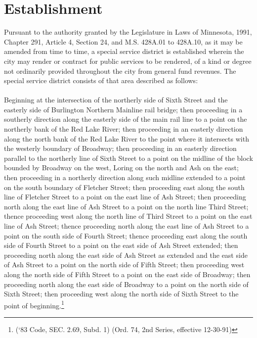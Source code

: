 
\setcounter{section}{14}
\section{Establishment}
Pursuant to the authority granted by the Legislature in Laws of Minnesota, 1991, Chapter 291, Article 4, Section 24, and M.S. \textsection 428A.01 to \textsection 428A.10, as it may be amended from time to time, a special service district is established wherein the city may render or contract for public services to be rendered, of a kind or degree not ordinarily provided throughout the city from general fund revenues. The special service district consists of that area described as follows:\\
\\
Beginning at the intersection of the northerly side of Sixth Street and the easterly side of Burlington Northern Mainline rail bridge; then proceeding in a southerly direction along the easterly side of the main rail line to a point on the northerly bank of the Red Lake River; then proceeding in an easterly direction along the north bank of the Red Lake River to the point where it intersects with the westerly boundary of Broadway; then proceeding in an easterly direction parallel to the northerly line of Sixth Street to a point on the midline of the block bounded by Broadway on the west, Loring on the north and Ash on the east; then proceeding in a northerly direction along such midline extended to a point on the south boundary of Fletcher Street; then proceeding east along the south line of Fletcher Street to a point on the east line of Ash Street; then proceeding north along the east line of Ash Street to a point on the north line Third Street; thence proceeding west along the north line of Third Street to a point on the east line of Ash Street; thence proceeding north along the east line of Ash Street to a point on the south side of Fourth Street; thence proceeding east along the south side of Fourth Street to a point on the east side of Ash Street extended; then proceeding north along the east side of Ash Street as extended and the east side of Ash Street to a point on the north side of Fifth Street; then proceeding west along the north side of Fifth Street to a point on the east side of Broadway; then proceeding north along the east side of Broadway to a point on the north side of Sixth Street; then proceeding west along the north side of Sixth Street to the point of beginning.\footnote{(‘83 Code, SEC. 2.69, Subd. 1) (Ord. 74, 2nd Series, effective 12-30-91)}

